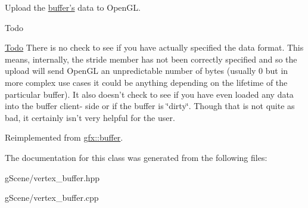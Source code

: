 Upload the \hyperlink{classgfx_1_1buffer}{buffer's} data to Open\-G\-L. 

\begin{DoxyRefDesc}{Todo}
\item[\hyperlink{todo__todo000011}{Todo}]There is no check to see if you have actually specified the data format. This means, internally, the stride member has not been correctly specified and so the upload will send Open\-G\-L an unpredictable number of bytes (usually 0 but in more complex use cases it could be anything depending on the lifetime of the particular buffer). It also doesn't check to see if you have even loaded any data into the buffer client-\/ side or if the buffer is \char`\"{}dirty\char`\"{}. Though that is not quite as bad, it certainly isn't very helpful for the user. \end{DoxyRefDesc}


Reimplemented from \hyperlink{classgfx_1_1buffer_a7019485ae327de1d5d5525185196ff43}{gfx\-::buffer}.



The documentation for this class was generated from the following files\-:\begin{DoxyCompactItemize}
\item 
g\-Scene/vertex\-\_\-buffer.\-hpp\item 
g\-Scene/vertex\-\_\-buffer.\-cpp\end{DoxyCompactItemize}

